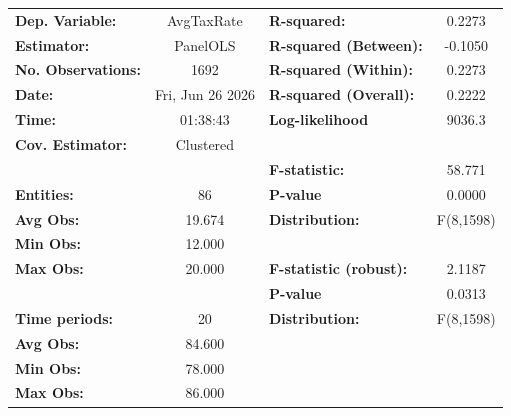 \begin{center}
\begin{tabular}{lclc}
\toprule
\textbf{Dep. Variable:}                       &     AvgTaxRate     & \textbf{  R-squared:         }   &      0.2273      \\
\textbf{Estimator:}                           &      PanelOLS      & \textbf{  R-squared (Between):}  &     -0.1050      \\
\textbf{No. Observations:}                    &        1692        & \textbf{  R-squared (Within):}   &      0.2273      \\
\textbf{Date:}                                &  Fri, Jun 26 2026  & \textbf{  R-squared (Overall):}  &      0.2222      \\
\textbf{Time:}                                &      01:38:43      & \textbf{  Log-likelihood     }   &      9036.3      \\
\textbf{Cov. Estimator:}                      &     Clustered      & \textbf{                     }   &                  \\
\textbf{}                                     &                    & \textbf{  F-statistic:       }   &      58.771      \\
\textbf{Entities:}                            &         86         & \textbf{  P-value            }   &      0.0000      \\
\textbf{Avg Obs:}                             &       19.674       & \textbf{  Distribution:      }   &    F(8,1598)     \\
\textbf{Min Obs:}                             &       12.000       & \textbf{                     }   &                  \\
\textbf{Max Obs:}                             &       20.000       & \textbf{  F-statistic (robust):} &      2.1187      \\
\textbf{}                                     &                    & \textbf{  P-value            }   &      0.0313      \\
\textbf{Time periods:}                        &         20         & \textbf{  Distribution:      }   &    F(8,1598)     \\
\textbf{Avg Obs:}                             &       84.600       & \textbf{                     }   &                  \\
\textbf{Min Obs:}                             &       78.000       & \textbf{                     }   &                  \\
\textbf{Max Obs:}                             &       86.000       & \textbf{                     }   &                  \\

\end{tabular}
\end{center}
